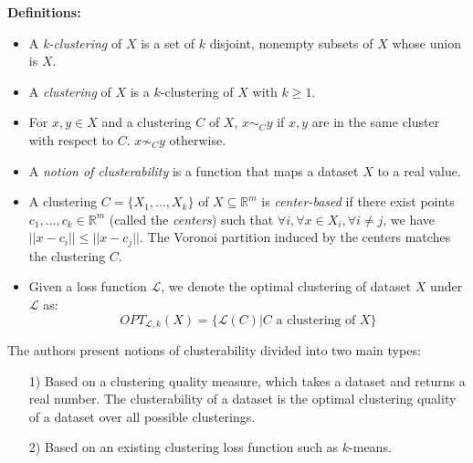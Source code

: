     \textbf{Definitions:}
    \begin{itemize}
        \item A \textit{k-clustering} of $X$ is a set of $k$ disjoint, nonempty subsets of $X$ whose union is $X$. 
        \item A \textit{clustering} of $X$ is a $k$-clustering of $X$ with $k\geq 1$.
        \item For $x,y\in X$ and a clustering $C$ of $X$, $x\sim_C y$ if $x,y$ are in the same cluster with respect to $C$. $x\not\sim_C y$ otherwise.
        \item A \textit{notion of clusterability} is a function that maps a dataset $X$ to a real value.
        \item A clustering $C = \{X_1,...,X_k\}$ of $X\subseteq \mathbb{R}^m$ is \textit{center-based} if there exist points $c_1,...,c_k \in \mathbb{R}^m$ (called the \textit{centers}) such that $\forall i,\forall x\in X_i, \forall i\neq j$, we have $||x-c_i||\leq||x-c_j||$. The Voronoi partition induced by the centers matches the clustering $C$.
        \item Given a loss function $\mathcal{L}$, we denote the optimal clustering of dataset $X$ under $\mathcal{L}$ as:
        $$OPT_{\mathcal{L},k}(X) = \{\mathcal{L}(C)|C\text{ a clustering of }X\}$$
    \end{itemize}
    
    The authors present notions of clusterability divided into two main types:
    \begin{enumerate}
        \item[1)] Based on a clustering quality measure, which takes a dataset and returns a real number. The clusterability of a dataset is the optimal clustering quality of a dataset over all possible clusterings.
        
        \item[2)] Based on an existing clustering loss function such as $k$-means.
    \end{enumerate}
